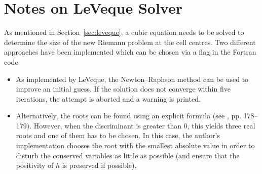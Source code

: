 \section{Notes on LeVeque Solver}
\label{sec:cubic}

As mentioned in Section~\ref{sec:leveque}, a cubic equation needs to be solved to determine the size of the new Riemann problem at the cell centres. Two different approaches have been implemented which can be chosen via a flag in the Fortran code:

\begin{itemize}
  \item As implemented by LeVeque, the Newton--Raphson method can be used to improve an initial guess. If the solution does not converge within five iterations, the attempt is aborted and a warning is printed.
  \item Alternatively, the roots can be found using an explicit formula (see \citet{press2007numerical}, pp. 178--179). However, when the discriminant is greater than $0$, this yields three real roots and one of them has to be chosen. In this case, the author's implementation chooses the root with the smallest absolute value in order to disturb the conserved variables as little as possible (and ensure that the positivity of $h$ is preserved if possible).
\end{itemize}